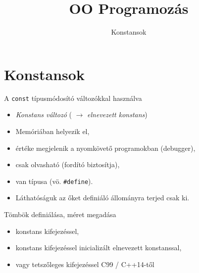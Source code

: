 \documentclass[usenames,dvipsnames,aspectratio=169]{beamer}
\title[OO Programozás - C++]{OO Programozás}
\subtitle{Konstansok}
\begin{document}
\begin{frame}[plain]
  \titlepage
  \logoalul
\end{frame}

\section{Konstansok}

\begin{frame}
    A \texttt{const} típusmódosító változókkal használva
    \begin{itemize}
        \item \emph{Konstans változó} ( $\to$ \emph{elnevezett konstans})
        \item Memóriában helyezik el, 
        \item értéke megjelenik a nyomkövető programokban (debugger),
        \item csak olvasható (fordító biztosítja),
        \item van típusa (vö. \texttt{\#define}).
        \item Láthatóságuk az őket definiáló állományra terjed csak ki.
    \end{itemize}
    \vfill
    Tömbök definiálása, méret megadása
    \begin{itemize}
        \item konstans kifejezéssel,
        \item konstans kifejezéssel inicializált elnevezett konstanssal,
        \item vagy tetszőleges kifejezéssel C99 / C++14-től
    \end{itemize}
\end{frame}

\begin{frame}
    \begin{exampleblock}{}
        
    \end{exampleblock}
\end{frame}

\begin{frame}
    \begin{exampleblock}{}
        \small
        
    \end{exampleblock}
\end{frame}

\begin{frame}
    \begin{exampleblock}{}
        
    \end{exampleblock}
    \begin{exampleblock}{}
        
    \end{exampleblock}
\end{frame}
\end{document}
